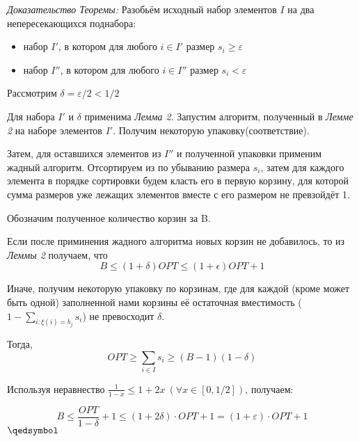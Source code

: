\documentclass[a4paper,14pt,russian]{article}
\begin{document}
\textit{Доказательство Теоремы:} Разобьём исходный набор элементов $I$ на два непересекающихся поднабора:

\begin{itemize}
  \item набор $I'$, в котором для любого $i \in I'$ размер $s_{i} \geq \varepsilon$ 
  \item набор $I''$, в котором для любого $i \in I''$ размер $s_{i} < \varepsilon$ 
\end{itemize}

Рассмотрим $\delta = \varepsilon / 2 < 1/2$

Для набора $I'$ и $\delta$ применима \textit{Лемма 2}. Запустим алгоритм, полученный в \textit{Лемме 2} на наборе элементов $I'$. Получим некоторую упаковку(соответствие). 

Затем, для оставшихся элементов из $I''$ и полученной упаковки применим жадный алгоритм. Отсортируем из по убыванию размера $s_i$, затем для каждого элемента в порядке сортировки будем класть его в первую корзину, для которой сумма размеров уже лежащих элементов вместе с его размером не превзойдёт 1.

Обозначим полученное количество корзин за B.

Если после приминения жадного алгоритма новых корзин не добавилось, то из \textit{Леммы 2} получаем, что  
$$ B \leq (1 + \delta)OPT \leq (1 + \epsilon)OPT + 1$$

Иначе, получим некоторую упаковку по корзинам, где для каждой (кроме может быть одной) заполненной нами корзины её остаточная вместимость ($1 - \sum_{i: \xi(i) = b_j} s_i$) не превосходит $\delta$. 

Тогда, 
$$OPT \geq \sum_{i \in I} s_i \geq (B - 1)(1 - \delta)$$

Используя неравнество $\frac{1}{1 - x} \leq 1 + 2x \: (\forall x \in [0, 1/2])$, получаем:

$$ B \leq \frac{OPT}{1 - \delta} + 1 \leq (1 + 2\delta) \cdot OPT + 1 =  (1 + \varepsilon) \cdot OPT + 1 $$ 
$\qedsymbol$
  
  
\newpage



\renewcommand\refname{\centering Список литературы}
\begin{thebibliography}{9}


   
\end{thebibliography}
\end{document}
